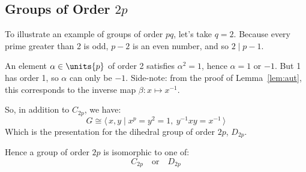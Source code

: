 \subsection{Groups of Order \(2p\)}
To illustrate an example of groups of order \(pq\), let's take \(q = 2\).
Because every prime greater than 2 is odd, \(p - 2\) is an even number, and so \(2 \mid p - 1\).

An element \(\alpha \in \units{p}\) of order 2 satisfies \(\alpha^2 = 1\), hence \(\alpha = 1\) or \(-1\).
But 1 has order 1, so \(\alpha\) can only be \(-1\).
Side-note: from the proof of Lemma~\ref{lem:aut}, this corresponds to the inverse map \(\beta:x \mapsto
x^{-1}\).

So, in addition to \(C_{2p}\), we have:
\[G \cong \langle\, x, y \mid x^p = y^2 = 1,\ y^{-1}xy = x^{-1}\,\rangle\]
Which is the presentation for the dihedral group of order \(2p\), \(D_{2p}\).

Hence a group of order \(2p\) is isomorphic to one of:
\[C_{2p} \quad \text{or} \quad D_{2p}\]
